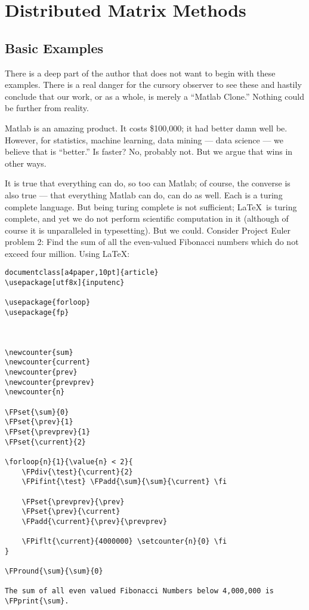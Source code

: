 \part{Distributed Matrix Methods}
\label{part:dmat}


\chapter{Basic Examples}

There is a deep part of the author that does not want to begin with these examples.  There is a real danger for the cursory observer to see these and hastily conclude that our work, or  as a whole, is merely a ``Matlab Clone.''  Nothing could be further from reality.

Matlab is an amazing product.  It costs \$100,000; it had better damn well be.  However, for statistics, machine learning, data mining --- data science --- we believe that  is ``better.''  Is  faster?  No, probably not.  But we argue that  wins in other ways.

It is true that everything  can do, so too can Matlab; of course, the converse is also true --- that everything Matlab can do,  can do as well.  Each is a turing complete language.  But being turing complete is not sufficient; \LaTeX\ is turing complete, and yet we do not perform scientific computation in it (although of course it is unparalleled in typesetting).  But we could.  Consider Project Euler problem 2:  Find the sum of all the even-valued Fibonacci numbers which do not exceed four million.  Using \LaTeX:

\begin{lstlisting}
documentclass[a4paper,10pt]{article}
\usepackage[utf8x]{inputenc}
 
\usepackage{forloop}  
\usepackage{fp}  
 

 
\newcounter{sum}
\newcounter{current}
\newcounter{prev}
\newcounter{prevprev}
\newcounter{n}
 
\FPset{\sum}{0}
\FPset{\prev}{1}
\FPset{\prevprev}{1}
\FPset{\current}{2}
 
\forloop{n}{1}{\value{n} < 2}{
    \FPdiv{\test}{\current}{2}
    \FPifint{\test} \FPadd{\sum}{\sum}{\current} \fi
 
    \FPset{\prevprev}{\prev}
    \FPset{\prev}{\current}
    \FPadd{\current}{\prev}{\prevprev}
 
    \FPiflt{\current}{4000000} \setcounter{n}{0} \fi
}
 
\FPround{\sum}{\sum}{0}
 
The sum of all even valued Fibonacci Numbers below 4,000,000 is \FPprint{\sum}.
 

\end{lstlisting}

